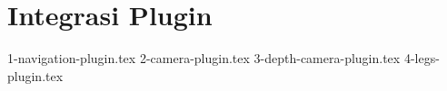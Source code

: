 \section{Integrasi Plugin}
\label{sec:integrasiplugin}

\textcolor{red}{\lipsum[1-2]}

{1-navigation-plugin.tex}
{2-camera-plugin.tex}
{3-depth-camera-plugin.tex}
{4-legs-plugin.tex}
